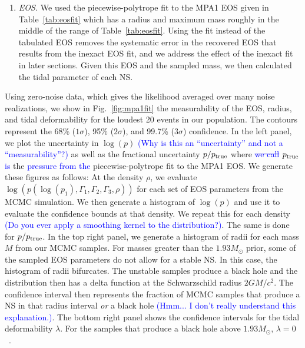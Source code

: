 \documentclass[twocolumn,prd,amssymb,aps,nofootinbib,showpacs,epsf]{revtex4}
\newcommand\les[2]{\textcolor{blue}{{#1}\sout{#2}}}
\begin{document}
\begin{enumerate}
\item \textit{EOS.} We used the piecewise-polytrope fit to the MPA1 EOS given in Table~\ref{tab:eosfit} which has a radius and maximum mass roughly in the middle of the range of Table~\ref{tab:eosfit}. Using the fit instead of the tabulated EOS removes the systematic error in the recovered EOS that results from the inexact EOS fit, and we address the effect of the inexact fit in later sections. Given this EOS and the sampled mass, we then calculated the tidal parameter of each NS.

\end{enumerate}

Using zero-noise data, which gives the likelihood averaged over many noise realizations, we show in Fig.~\ref{fig:mpa1fit} the measurability of the EOS, radius, and tidal deformability for the loudest 20 events in our population. The contours represent the 68\% ($1\sigma$), 95\% ($2\sigma$), and 99.7\% ($3\sigma$) confidence. In the left panel, we plot the uncertainty in $\log(p)$ \les{(Why is this an ``uncertainty'' and not a ``measurability''?)}{} as well as the fractional uncertainty $p/p_{\rm true}$ where \les{}{we call} $p_{\rm true}$ \les{is}{} the \les{pressure from the}{} piecewise-polytrope fit to the MPA1 EOS. We generate these figures as follows: At the density $\rho$, we evaluate $\log(p(\log(p_1), \Gamma_1, \Gamma_2, \Gamma_3, \rho))$ for each set of EOS parameters from the MCMC simulation. We then generate a histogram of $\log(p)$ and use it to evaluate the confidence bounds at that density. We repeat this for each density \les{(Do you ever apply a smoothing kernel to the distribution?)}{}. The same is done for $p/p_{\rm true}$. In the top right panel, we generate a histogram of radii for each mass $M$ from our MCMC samples. For masses greater than the $1.93M_\odot$ prior, some of the sampled EOS parameters do not allow for a stable NS. In this case, the histogram of radii bifurcates. The unstable samples produce a black hole and the distribution then has a delta function at the Schwarzschild radius $2GM/c^2$. The confidence interval then represents the fraction of MCMC samples that produce a NS in that radius interval \textit{or} a black hole \les{(Hmm... I don't really understand this explanation.)}{}. The bottom right panel shows the confidence intervals for the tidal deformability $\lambda$. For the samples that produce a black hole above $1.93M_\odot$, $\lambda=0$~\cite{BinningtonPoisson2009}.
\end{document}
